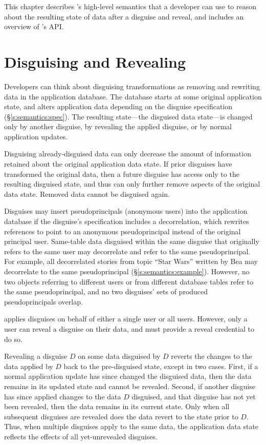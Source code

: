 This chapter describes \sys's high-level semantics that a developer can use to
reason about the resulting state of data after a disguise and reveal, and 
includes an overview of \sys's API.

\section{Disguising and Revealing}
\label{s:semantics:hl}
Developers can think about disguising transformations as removing and rewriting
data in the application database.
%
The database starts at some original application state, and alters application
data depending on the disguise specification (\S\ref{s:semantics:spec}).  The
resulting state---the disguised data state---is changed only by another
disguise, by revealing the applied disguise, or by normal application updates.
%

%
Disguising already-disguised data can only decrease the amount of information
retained about the original application data state. If prior disguises have
transformed the original data, then a future disguise has access only to the
resulting disguised state, and thus can only further remove aspects of the
original data state.
%
Removed data cannot be disguised again. 
%

Disguises may insert pseudoprincipals (anonymous users) into the application
database if the disguise's specification includes a decorrelation, which
rewrites references to point to an anonymous pseudoprincipal instead of the
original principal user. 
%
Same-table data disguised within the same disguise that originally refers to the
same user may decorrelate and refer to the same pseudoprincipal.
%
For example, all decorrelated stories from topic ``Star Wars'' written by Bea
may decorrelate to the same pseudoprincipal (\S\ref{s:semantics:example}).
%
However, no two objects referring to different users or from different database
tables refer to the same pseudoprincipal, and no two disguises' sets of produced
pseudoprincipals overlap.
%

%
\sys applies disguises on behalf of either a single user or all users. However,
only a user can reveal a disguise on their data, and must provide a reveal
credential to do so.
%

%
Revealing a disguise $D$ on some data disguised by $D$ reverts the changes to
the data applied by $D$ back to the pre-disguised state, except in two cases.
First, if a normal application update has since changed the disguised data, then
the data remains in its updated state and cannot be revealed.
%
Second, if another disguise has since applied changes to the data $D$ disguised,
and that disguise has not yet been revealed, then the data remains in its
current state.
%
Only when all subsequent disguises are revealed does the data revert to the
state prior to $D$.
%
Thus, when multiple disguises apply to the same data, the application data state
reflects the effects of all yet-unrevealed disguises.
%

